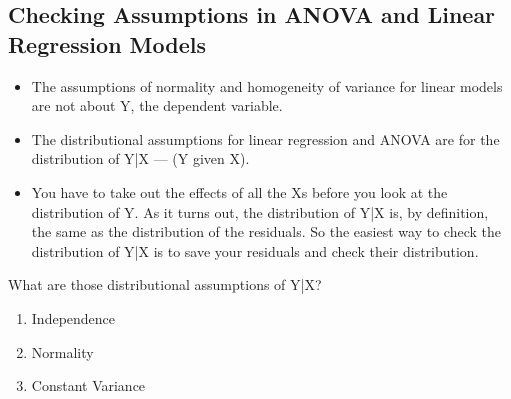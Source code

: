 \documentclass[residuals.tex]{subfiles}
\begin{document}
	
	\Large
	
	
	
\subsection{Checking Assumptions in ANOVA and Linear Regression Models}
%
\begin{itemize}
\item The assumptions of normality and homogeneity of variance for linear models are not about Y, the dependent variable.  


\item The distributional assumptions for linear regression and ANOVA are for the distribution of Y|X — (Y given X).  

\item You have to take out the effects of all the Xs before you look at the distribution of Y.  As it turns out, the distribution of Y|X is, by definition, the same as the distribution of the residuals.  So the easiest way to check the distribution of Y|X is to save your residuals and check their distribution.



%
\end{itemize}
What are those distributional assumptions of Y|X?


\begin{enumerate}
\item Independence

\item Normality

\item Constant Variance

\end{enumerate}
\end{document}
